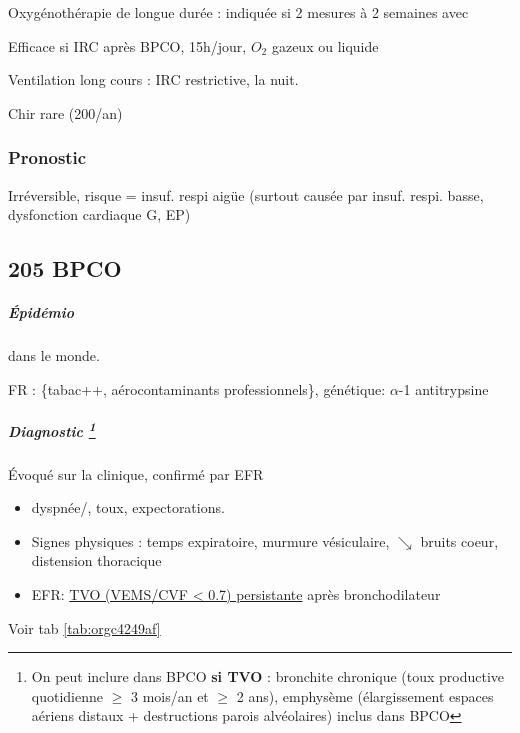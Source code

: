 \documentclass[11pt]{article}
\begin{document}
Oxygénothérapie de longue durée : indiquée si 2 mesures à 2 semaines avec


Efficace si  IRC après BPCO, 15h/jour, \(O_2\) gazeux ou liquide

Ventilation long cours : IRC restrictive, la nuit.

Chir rare (200/an)

\subsubsection{Pronostic}
\label{sec:orgd4aaa70}
\label{sec:org2ec66b4}
Irréversible, risque = insuf. respi aigüe (surtout causée par insuf. respi. basse, dysfonction
cardiaque G, EP)


\subsection{205 BPCO}
\label{sec:org3957d3f}

\subparagraph{Épidémio}
\label{sec:org9a1c5e6}
\inc dans le monde. 

FR : \{tabac++, aérocontaminants professionnels\}, génétique: \(\alpha\)-1 antitrypsine

\subparagraph{Diagnostic \footnote{On peut inclure dans BPCO \textbf{si TVO} : bronchite chronique (toux
productive quotidienne \(\ge\) 3 mois/an et \(\ge\) 2 ans), emphysème (élargissement espaces aériens distaux + destructions parois
alvéolaires) inclus dans BPCO}}
\label{sec:org8cbb5c8}
Évoqué sur la clinique, confirmé par EFR
\begin{itemize}
\item dyspnée/, toux, expectorations.
\item Signes physiques  : \nearrow temps expiratoire, \searrow murmure vésiculaire, \(\searrow\) bruits coeur, distension thoracique
\item EFR: \uline{TVO (VEMS/CVF < 0.7) persistante} après bronchodilateur
\end{itemize}

Voir tab \ref{tab:orgc4249af}
\end{document}
